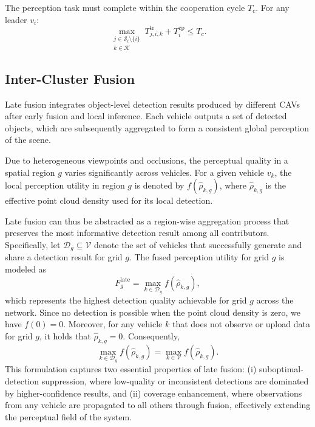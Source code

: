 \documentclass[conference]{IEEEtran}
\begin{document}
The perception task must complete within the cooperation cycle $T_c$. For any leader $v_i$:
\begin{equation}
\max_{\substack{j \in \mathcal{S}_i \setminus \{i\} \\ k \in \mathcal{K}}} T^{\mathrm{tr}}_{j,i,k} + T^{\mathrm{cp}}_{i} \leq T_c.
\label{eq:delay}
\end{equation}

\subsection{Inter-Cluster Fusion}
\label{sec:inter_cluster}
Late fusion integrates object-level detection results produced by different CAVs after early fusion and local inference. Each vehicle outputs a set of detected objects, which are subsequently aggregated to form a consistent global perception of the scene.

Due to heterogeneous viewpoints and occlusions, the perceptual quality in a spatial region $g$ varies significantly across vehicles. For a given vehicle $v_k$, the local perception utility in region $g$ is denoted by $f(\hat{\rho}_{k,g})$, where $\hat{\rho}_{k,g}$ is the effective point cloud density used for its local detection.

Late fusion can thus be abstracted as a region-wise aggregation process that preserves the most informative detection result among all contributors. Specifically, let $\mathcal{D}_g \subseteq \mathcal{V}$ denote the set of vehicles that successfully generate and share a detection result for grid $g$. The fused perception utility for grid $g$ is modeled as
\begin{equation}
F_g^{\mathrm{late}} = \max_{k \in \mathcal{D}_g} f(\hat{\rho}_{k,g}),
\label{eq:F_fusion_max}
\end{equation}
which represents the highest detection quality achievable for grid $g$ across the network. Since no detection is possible when the point cloud density is zero, we have $f(0) = 0$. Moreover, for any vehicle $k$ that does not observe or upload data for grid $g$, it holds that $\hat{\rho}_{k,g} = 0$. Consequently,
\begin{equation}
\max_{k \in \mathcal{D}_g} f(\hat{\rho}_{k,g}) = \max_{k \in \mathcal{V}} f(\hat{\rho}_{k,g}).
\end{equation}
This formulation captures two essential properties of late fusion: (i) suboptimal-detection suppression, where low-quality or inconsistent detections are dominated by higher-confidence results, and (ii) coverage enhancement, where observations from any vehicle are propagated to all others through fusion, effectively extending the perceptual field of the system.
\end{document}
